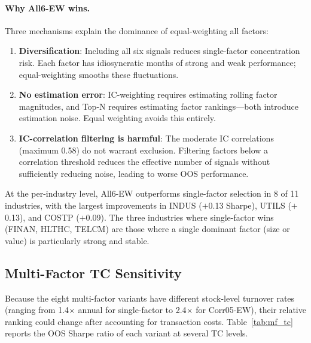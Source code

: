 \documentclass[12pt,a4paper]{article}
\begin{document}
\paragraph{Why All6-EW wins.} Three mechanisms explain the dominance of equal-weighting all factors:

\begin{enumerate}
    \item \textbf{Diversification}: Including all six signals reduces single-factor concentration risk. Each factor has idiosyncratic months of strong and weak performance; equal-weighting smooths these fluctuations.

    \item \textbf{No estimation error}: IC-weighting requires estimating rolling factor magnitudes, and Top-N requires estimating factor rankings---both introduce estimation noise. Equal weighting avoids this entirely.

    \item \textbf{IC-correlation filtering is harmful}: The moderate IC correlations (maximum 0.58) do not warrant exclusion. Filtering factors below a correlation threshold reduces the effective number of signals without sufficiently reducing noise, leading to worse OOS performance.
\end{enumerate}

At the per-industry level, All6-EW outperforms single-factor selection in 8 of 11 industries, with the largest improvements in INDUS ($+$0.13 Sharpe), UTILS ($+$0.13), and COSTP ($+$0.09). The three industries where single-factor wins (FINAN, HLTHC, TELCM) are those where a single dominant factor (size or value) is particularly strong and stable.

\subsection{Multi-Factor TC Sensitivity}
\label{sec:mf_tc}

Because the eight multi-factor variants have different stock-level turnover rates (ranging from 1.4$\times$ annual for single-factor to 2.4$\times$ for Corr05-EW), their relative ranking could change after accounting for transaction costs. Table~\ref{tab:mf_tc} reports the OOS Sharpe ratio of each variant at several TC levels.
\end{document}
